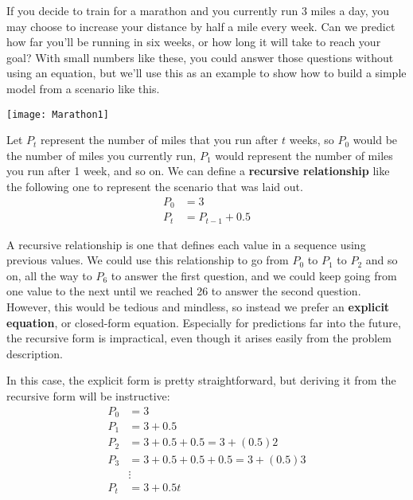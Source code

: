 \setcounter{ExampleCounter}{1}
If you decide to train for a marathon and you currently run 3 miles a day, you may choose to increase your distance by half a mile every week.  Can we predict how far you'll be running in six weeks, or how long it will take to reach your goal?  With small numbers like these, you could answer those questions without using an equation, but we'll use this as an example to show how to build a simple model from a scenario like this.

\begin{center}
\texttt{[image: Marathon1]}
\end{center}

Let $P_t$ represent the number of miles that you run after $t$ weeks, so $P_0$ would be the number of miles you currently run, $P_1$ would represent the number of miles you run after 1 week, and so on.  We can define a \textbf{recursive relationship} like the following one to represent the scenario that was laid out.
\begin{align*}
P_0 &= 3\\
P_t &= P_{t-1} + 0.5
\end{align*}

A recursive relationship is one that defines each value in a sequence using previous values.  We could use this relationship to go from $P_0$ to $P_1$ to $P_2$ and so on, all the way to $P_6$ to answer the first question, and we could keep going from one value to the next until we reached 26 to answer the second question.  However, this would be tedious and mindless, so instead we prefer an \textbf{explicit equation}, or closed-form equation.  Especially for predictions far into the future, the recursive form is impractical, even though it arises easily from the problem description.

In this case, the explicit form is pretty straightforward, but deriving it from the recursive form will be instructive:
\begin{align*}
P_0 &= 3\\
P_1 &= 3+0.5\\
P_2 &= 3+0.5+0.5 = 3+(0.5)2\\
P_3 &= 3+0.5+0.5+0.5 = 3 + (0.5)3\\
&\vdots\\
P_t &= 3 + 0.5t
\end{align*}


